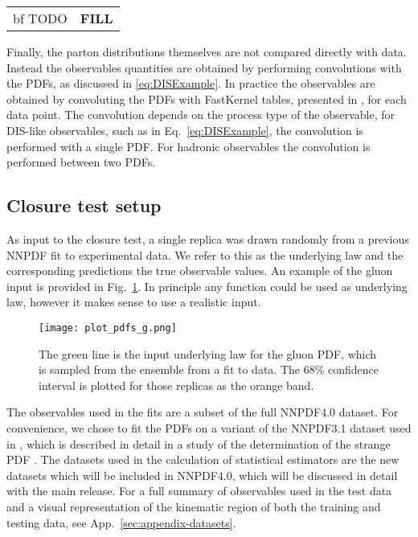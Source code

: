 \begin{table}
    \begin{tabular}[h]{c|c}
        {\rm bf TODO} & {\bf FILL}
    \end{tabular}
\end{table}

Finally, the parton distributions themselves are not compared directly with data.
Instead the observables quantities are obtained by performing convolutions with
the PDFs, as discussed in \ref{eq:DISExample}. In practice the observables are
obtained by convoluting the PDFs with FastKernel tables, presented in
\cite{Ball_2010,Bertone_2017}, for each data point. The convolution depends
on the process type of the observable, for DIS-like observables, such as in
Eq.~\ref{eq:DISExample}, the convolution is performed with a single PDF. For
hadronic observables the convolution is performed between two PDFs.

\subsection{Closure test setup}

As input to the closure test, a single replica was drawn randomly from
a previous NNPDF fit to experimental data. We refer to this as the underlying
law and the corresponding predictions the true observable values. An example
of the gluon input is provided in Fig.~\ref{fig:InputGluonPDF}. In principle
any function could be used as underlying law, however it makes sense to
use a realistic input.

\begin{figure}
    \centering
    \texttt{[image: plot\_pdfs\_g.png]}
    \caption{The green line is the input underlying law for the gluon PDF,
    which is sampled from the ensemble from a fit to data. The 68\% confidence
    interval is plotted for those replicas as the orange band.}
    \label{fig:InputGluonPDF}
\end{figure}

The observables used in the fits are a subset of the full NNPDF4.0 dataset.
For convenience,
we chose to fit the PDFs on a variant of the NNPDF3.1 dataset used in
\cite{Ball_2018}, which is described in detail in a study of the determination
of the strange PDF \cite{Faura_2020}. The datasets used in the calculation of
statistical estimators are the new datasets which will be included in NNPDF4.0,
which will be discussed in detail with the main release. For a full summary of
observables used in the test data and a visual representation of the kinematic
region of both the training and testing data, see App.~\ref{sec:appendix-datasets}.

